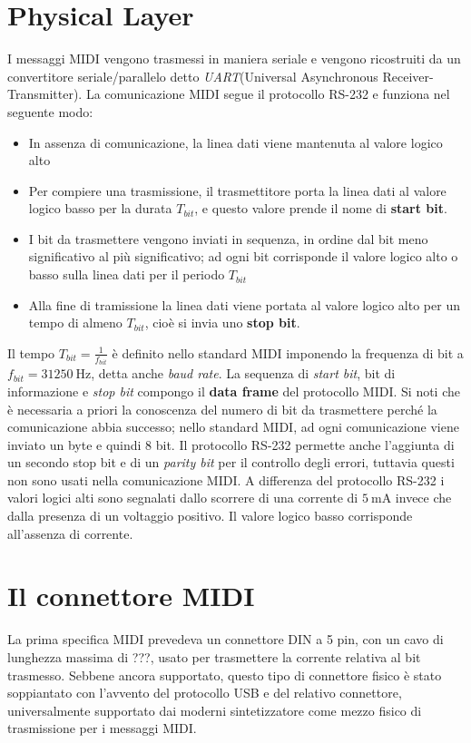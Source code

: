 \section{Physical Layer}
I messaggi MIDI vengono trasmessi in maniera seriale e vengono ricostruiti da un convertitore seriale/parallelo detto \textit{UART}(Universal Asynchronous Receiver-Transmitter).
La comunicazione MIDI segue il protocollo RS-232 e funziona nel seguente modo:
\begin{itemize}
	\item In assenza di comunicazione, la linea dati viene mantenuta al valore logico alto
	\item Per compiere una trasmissione, il trasmettitore porta la linea dati al valore logico basso per la durata $T_{bit}$, e questo valore prende il nome di \textbf{start bit}.
	\item I bit da trasmettere vengono inviati in sequenza, in ordine dal bit meno significativo al più significativo; ad ogni bit corrisponde il valore logico alto o basso sulla linea dati per il periodo $T_{bit}$
	\item Alla fine di tramissione la linea dati viene portata al valore logico alto per un tempo di almeno $T_{bit}$, cioè si invia uno \textbf{stop bit}.
\end{itemize}
Il tempo $T_{bit} = \frac{1}{f_{bit}}$ è definito nello standard MIDI imponendo la frequenza di bit a $f_{bit} = \SI{31250}{\hertz}$, detta anche
\textit{baud rate}.
La sequenza di \textit{start bit}, bit di informazione e \textit{stop bit} compongo il \textbf{data frame} del protocollo MIDI.
Si noti che è necessaria a priori la conoscenza del numero di bit da trasmettere perché la comunicazione abbia successo; nello standard MIDI, ad ogni comunicazione viene inviato un byte e quindi 8 bit.
Il protocollo RS-232 permette anche l'aggiunta di un secondo stop bit e di un \textit{parity bit} per il controllo degli errori, tuttavia questi non sono usati nella comunicazione MIDI.
A differenza del protocollo RS-232 i valori logici alti sono segnalati dallo scorrere di una corrente di $\SI{5}{\milli\ampere}$ invece che dalla presenza di un voltaggio positivo.
Il valore logico basso corrisponde all'assenza di corrente.

\section{Il connettore MIDI}
La prima specifica MIDI prevedeva un connettore DIN a 5 pin, 
con un cavo di lunghezza massima di ???, usato per trasmettere
la corrente relativa al bit trasmesso.
Sebbene ancora supportato, questo tipo di connettore fisico è stato
soppiantato con l'avvento del protocollo USB e del relativo connettore,
universalmente supportato dai moderni sintetizzatore come mezzo fisico
di trasmissione per i messaggi MIDI.

